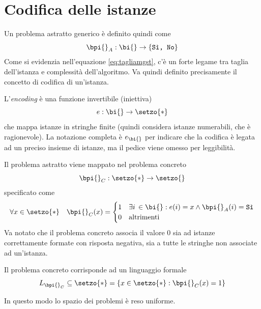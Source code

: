 \section{Codifica delle istanze}
Un problema astratto generico è definito quindi come
\begin{equation*}
    \bpi{}_{A} : \bi{} \to \left\{ \texttt{Sì, No} \right\}
\end{equation*}
Come si evidenzia nell'equazione \ref{eq:tagliamgst}, c'è un forte legame tra taglia dell'istanza e complessità dell'algoritmo. Va quindi definito precisamente il concetto di codifica di un'istanza.
\begin{definition}\label{def:codifica}
L'\emph{encoding} è una funzione invertibile (iniettiva)
\begin{equation*}
    e : \bi{} \to \setzo{*}
\end{equation*}
che mappa istanze in stringhe finite (quindi considera istanze numerabili, che è ragionevole). La notazione completa è $e_{\bi{}}$ per indicare che la codifica è legata ad un preciso insieme di istanze, ma il pedice viene omesso per leggibilità.
\end{definition}

Il problema astratto viene mappato nel problema concreto
\begin{equation*}
    \bpi{}_{C} : \setzo{*} \to \setzo{}
\end{equation*}
specificato come
\begin{equation*}
    \forall x \in \setzo{*} \quad
    \bpi{}_{C} (x) =
    \begin{cases}
        1 & \exists i \, \in \bi{} : e(i) = x \wedge \bpi{}_{A} (i) = \texttt{Sì} \\
        0 & \text{altrimenti}
    \end{cases}
\end{equation*}
Va notato che il problema concreto associa il valore $0$ sia ad istanze correttamente formate con risposta negativa, sia a tutte le stringhe non associate ad un'istanza.

Il problema concreto corrisponde ad un linguaggio formale
\begin{equation*}
    L_{\bpi{}_{C}} \subseteq \setzo{*} = \left\{ x \in \setzo{*} : \bpi{}_{C}(x) = 1 \right\}
\end{equation*}

In questo modo lo spazio dei problemi è reso uniforme.

